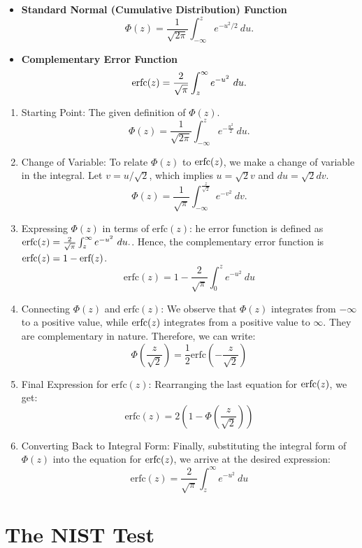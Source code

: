 \documentclass[12pt,openany]{book}
\theoremstyle{definition}
\begin{document}
	\begin{itemize}
		\item \textbf{Standard Normal (Cumulative Distribution) Function}
		\[
		\Phi(z)=\frac{1}{\sqrt{2\pi}}\int_{-\infty}^ze^{-u^2/2}\ du.
		\]
		\item \textbf{Complementary Error Function}
		\[
		\textnormal{erfc}(z)=\frac{2}{\sqrt{\pi}}\int_{z}^{\infty}e^{-u^2}\ du.
		\]
	\end{itemize}

	\begin{enumerate}[(1)]
		\item Starting Point: The given definition of $\Phi(z)$.
		\[
		\Phi(z) = \frac{1}{\sqrt{2\pi}}\int_{-\infty}^{z} e^{-\frac{u^2}{2}}\ du.
		\]
		\item Change of Variable:  To relate 
		$\Phi(z)$ to 
		$\textnormal{erfc}
		(z)$, we make a change of variable in the integral. Let 
		$v=u/\sqrt{2}$, which implies 
		$u=\sqrt{2}v$ and 
		$du=\sqrt{2}dv$. \[
			\Phi(z) = \frac{1}{\sqrt{\pi}}\int_{-\infty}^{\frac{z}{\sqrt{2}}} e^{-v^2}\ dv.
			\]
		\item Expressing \(\Phi(z)\) in terms of \(\text{erfc}(z)\): he error function is defined as $\textnormal{erfc}(z)=\frac{2}{\sqrt{\pi}}\int_{z}^{\infty}e^{-u^2}\ du.$. Hence, the complementary error function is 
		$\textnormal{erfc}(z)=1-\textnormal{erf}(z)$.
		\[
			\text{erfc}(z) = 1 - \frac{2}{\sqrt{\pi}}\int_{0}^{z} e^{-u^2}\ du
		\]
		\item Connecting \(\Phi(z)\) and \(\text{erfc}(z)\): We observe that 
		$\Phi(z)$ integrates from 
		$-\infty$ to a positive value, while 
		$\textnormal{erfc}(z)$ integrates from a positive value to 
		$\infty$. They are complementary in nature. Therefore, we can write:
		\[
			\Phi\left(\frac{z}{\sqrt{2}}\right) = \frac{1}{2} \text{erfc}\left(-\frac{z}{\sqrt{2}}\right)
		\]
		\item Final Expression for \(\text{erfc}(z)\): Rearranging the last equation for 
		$\textnormal{erfc}(z)$, we get:
		\[
			\text{erfc}(z) = 2 \left( 1 - \Phi\left(\frac{z}{\sqrt{2}}\right) \right)
		\]
		\item Converting Back to Integral Form:
		Finally, substituting the integral form of 
		$\Phi(z)$ into the equation for 
		$\textnormal{erfc}(z)$, we arrive at the desired expression:
		\[
			\text{erfc}(z) = \frac{2}{\sqrt{\pi}}\int_{z}^{\infty}e^{-u^2}\ du
		\]
	\end{enumerate}
	
	\newpage
	\section{The NIST Test}
\end{document}

